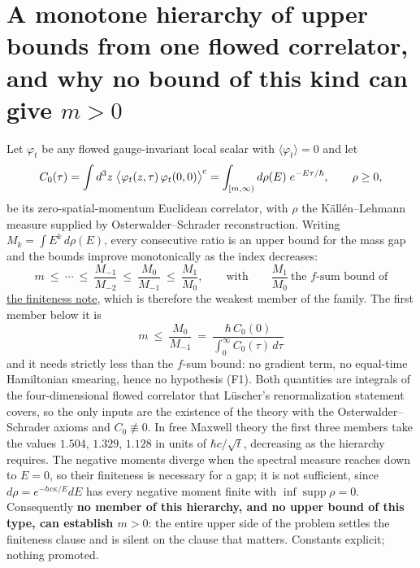 \documentclass[11pt,a4paper]{article}
\begin{document}
\hypertarget{a-monotone-hierarchy-of-upper-bounds-from-one-flowed-correlator-and-why-no-bound-of-this-kind-can-give-m0}{%
\section{\texorpdfstring{A monotone hierarchy of upper bounds from one
flowed correlator, and why no bound of this kind can give
\(m>0\)}{A monotone hierarchy of upper bounds from one flowed correlator, and why no bound of this kind can give m\textgreater0}}\label{a-monotone-hierarchy-of-upper-bounds-from-one-flowed-correlator-and-why-no-bound-of-this-kind-can-give-m0}}

Let \(\varphi_t\) be any flowed gauge-invariant local scalar with
\(\langle\varphi_t\rangle=0\) and let
\[C_0(\tau)=\int d^3z\;\big\langle\varphi_t(z,\tau)\,\varphi_t(0,0)\big\rangle^{\rm c}
=\int_{[m,\infty)}d\rho(E)\;e^{-E\tau/\hbar},\qquad \rho\ge0,\] be its
zero-spatial-momentum Euclidean correlator, with \(\rho\) the
Källén--Lehmann measure supplied by Osterwalder--Schrader
reconstruction. Writing \(M_k=\int E^k\,d\rho(E)\), every consecutive
ratio is an upper bound for the mass gap and the bounds improve
monotonically as the index decreases:
\[m\ \le\ \cdots\ \le\ \frac{M_{-1}}{M_{-2}}\ \le\ \frac{M_0}{M_{-1}}\ \le\ \frac{M_1}{M_0},
\qquad\text{with}\qquad \frac{M_1}{M_0}\ \text{the }f\text{-sum bound of}\]
\href{finiteness-half-flowed-susceptibility.md}{the finiteness note},
which is therefore the weakest member of the family. The first member
below it is
\[\boxed{\;m\ \le\ \frac{M_0}{M_{-1}}\ =\ \frac{\hbar\,C_0(0)}{\displaystyle\int_0^\infty C_0(\tau)\,d\tau}\;}\]
and it needs strictly less than the \(f\)-sum bound: no gradient term,
no equal-time Hamiltonian smearing, hence no hypothesis (F1). Both
quantities are integrals of the four-dimensional flowed correlator that
Lüscher's renormalization statement covers, so the only inputs are the
existence of the theory with the Osterwalder--Schrader axioms and
\(C_0\not\equiv0\). In free Maxwell theory the first three members take
the values \(1.504\), \(1.329\), \(1.128\) in units of
\(\hbar c/\sqrt t\), decreasing as the hierarchy requires. The negative
moments diverge when the spectral measure reaches down to \(E=0\), so
their finiteness is necessary for a gap; it is not sufficient, since
\(d\rho=e^{-\hbar c\kappa/E}dE\) has every negative moment finite with
\(\inf\operatorname{supp}\rho=0\). Consequently \textbf{no member of
this hierarchy, and no upper bound of this type, can establish \(m>0\)}:
the entire upper side of the problem settles the finiteness clause and
is silent on the clause that matters. Constants explicit; nothing
promoted.
\end{document}
